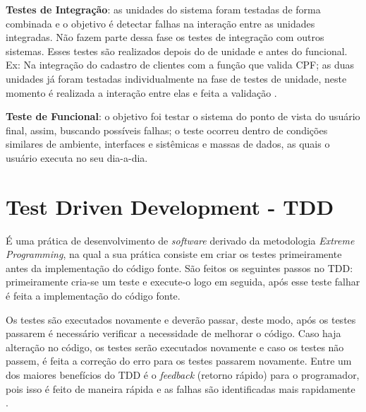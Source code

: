 \textbf{Testes de Integração}: as unidades do sistema foram testadas de forma combinada e o objetivo é detectar falhas na interação entre as unidades integradas. Não fazem parte dessa fase os testes de integração com outros sistemas. Esses testes são realizados depois do de unidade e antes do funcional. Ex: Na integração do cadastro de clientes com a função que valida CPF; as duas unidades já foram testadas individualmente na fase de testes de unidade, neste momento é realizada a interação entre elas e feita a validação \cite{integracao}. 
    
\textbf{Teste de Funcional}: o objetivo foi testar o sistema do ponto de vista do usuário final, assim, buscando possíveis falhas; o teste ocorreu dentro de condições similares de ambiente, interfaces e sistêmicas e massas de dados, as quais o usuário executa no seu dia-a-dia.

  \begin{comment}      
\textbf{ Teste de Aceitação}: o objetivo final foi verificar se o sistema desenvolvido está de acordo com o que foi solicitado. É escolhido um grupo restrito de usuários finais para simularem as operações de rotina do sistema.
  

 \textbf{ Teste de Regressão}: não corresponde a um nível de teste, mas é uma estratégia importante para a redução de "efeitos colaterais". Consiste em aplicar, a cada nova versão do software ou a cada ciclo, todos os procedimentos anteriormente aplicados nos mesmos. Para ter o aumento da produtividade e a viabilidade dos testes, é necessário o uso de ferramentas de automação, em uma nova versão ou ciclo, e verificar se foram reexecutados com agilidade e precisão.
\end{comment}    

\section{Test Driven Development - TDD}

\par É uma prática de desenvolvimento de \textit{software} derivado da metodologia \textit{Extreme Programming}, na qual a sua prática consiste em criar os testes primeiramente antes da implementação do código fonte. São feitos os seguintes passos no TDD: primeiramente cria-se um teste e execute-o logo em seguida, após esse teste falhar é feita a implementação do código fonte.

\par Os testes são executados novamente e deverão passar, deste modo, após os testes passarem é necessário verificar a necessidade de melhorar o código. Caso haja alteração no código, os testes serão executados novamente e caso os testes não passem, é feita a correção do erro para os testes passarem novamente. Entre um dos maiores benefícios do TDD é o \textit{feedback} (retorno rápido) para o programador, pois isso é feito de maneira rápida e as falhas são identificadas mais rapidamente \cite{tdd}.

